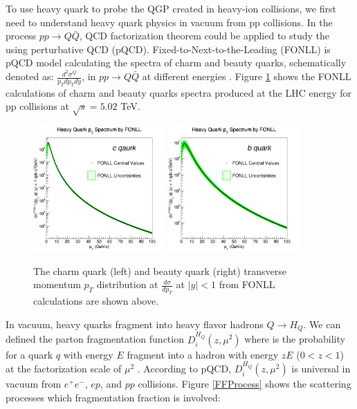 To use heavy quark to probe the QGP created in heavy-ion collisions, we first need to understand heavy quark physics in vacuum from pp collisions. In the process $pp \rightarrow Q \bar Q$, QCD factorization theorem could be applied to study the using perturbative QCD (pQCD). Fixed-to-Next-to-the-Leading (FONLL) is pQCD model calculating the spectra of charm and beauty quarks, schematically denoted as: $\frac{d^2\sigma^Q}{p_T dp_T dy}$, in $pp \rightarrow Q  \bar Q$ at different energies \cite{FONLLRef}. Figure \ref{FONLL} shows the FONLL calculations of charm and beauty quarks spectra produced at the LHC energy for pp collisions at $\sqrt s = 5.02$ TeV.

 \begin{figure}[hbtp]
\begin{center}
\includegraphics[width=0.45\textwidth]{Figures/Chapter1/Charm.png}
\includegraphics[width=0.45\textwidth]{Figures/Chapter1/Beauty.png}
\caption{The charm quark (left) and beauty quark (right) transverse momentum $p_T$ distribution at $\frac{d\sigma}{dp_T}$ at $|y| < 1$ from FONLL calculations are shown above.}
\label{FONLL}
\end{center}
\end{figure}   

In vacuum, heavy quarks fragment into heavy flavor hadrons $Q \rightarrow H_Q$. We can defined the parton fragmentation function $D^{H_Q}_{i}(z,\mu^2)$ where is the probability for a quark $q$ with energy $E$ fragment into a hadron with energy $zE$ ($0 < z < 1$) at the factorization scale of $\mu^2$ \cite{QCDFFunc}. According to pQCD, $D^{H_Q}_{i}(z,\mu^2)$ is universal in vacuum from $e^+e^-$, $ep$, and $pp$ collisions. Figure \ref{FFProcess} shows the scattering processes which fragmentation fraction is involved:

